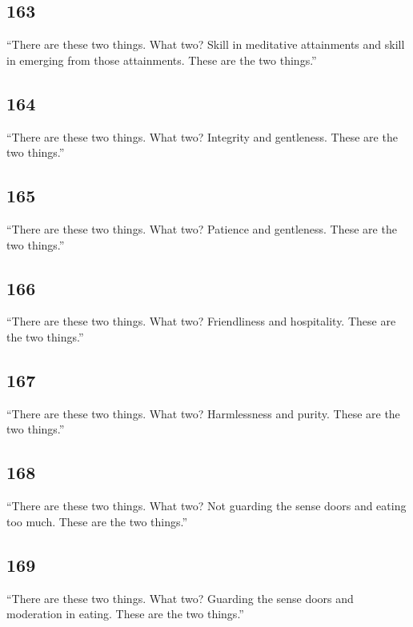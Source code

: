 \documentclass[12pt,openany]{book}%
\begin{document}
\subsection*{163 }

“There are these two things. What two? Skill in meditative attainments and skill in emerging from those attainments. These are the two things.” 

\subsection*{164 }

“There are these two things. What two? Integrity and gentleness. These are the two things.” 

\subsection*{165 }

“There are these two things. What two? Patience and gentleness. These are the two things.” 

\subsection*{166 }

“There are these two things. What two? Friendliness and hospitality. These are the two things.” 

\subsection*{167 }

“There are these two things. What two? Harmlessness and purity. These are the two things.” 

\subsection*{168 }

“There are these two things. What two? Not guarding the sense doors and eating too much. These are the two things.” 

\subsection*{169 }

“There are these two things. What two? Guarding the sense doors and moderation in eating. These are the two things.” 
\end{document}
